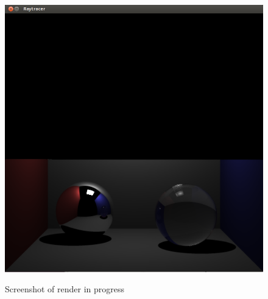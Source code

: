 \begin{figure}[h]
\centering
\includegraphics[scale=0.24]{./images/gui_screenshot.png}
\label{fig:gui_screenshot}
\caption{Screenshot of render in progress}
\end{figure}

